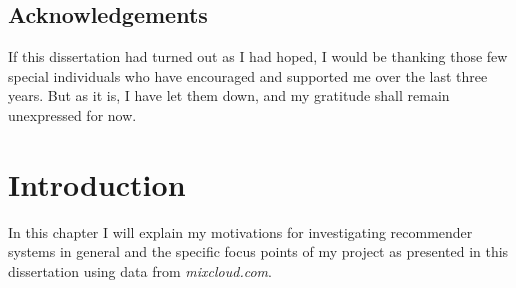 \documentclass[a4paper,12pt,twoside,notitlepage]{report}
\def\mixurl{\emph{mixcloud.com}}
\begin{document}

\section*{Acknowledgements}

If this dissertation had turned out as I had hoped, I would be thanking those
few special individuals who have encouraged and supported me over the last
three years. But as it is, I have let them down, and my gratitude shall remain
unexpressed for now.


\cleardoublepage

\tableofcontents
\clearpage

\clearpage
\listoffigures

\clearpage
\listoftables

\clearpage
\lstlistoflistings

\cleardoublepage



\setcounter{page}{1}
\setcounter{chapter}{0}
\pagestyle{headings}


\chapter{Introduction}


In this chapter I will explain my motivations for investigating recommender
systems in general and the specific focus points of my project as
presented in this dissertation using data from \mixurl.
\end{document}
